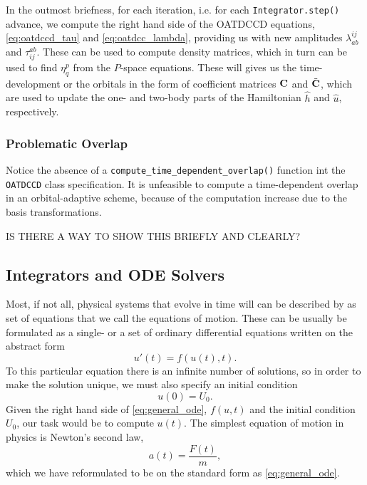     In the outmost briefness, for each iteration, i.e. for each 
    \lstinline{Integrator.step()} advance, we 
    compute the right hand side of the OATDCCD equations, \autoref{eq:oatdccd_tau} 
    and \autoref{eq:oatdcc_lambda}, providing us with new amplitudes 
    $\lambda^{ij}_{ab}$ and $\tau^{ab}_{ij}$. These can be used to compute density 
    matrices, which in turn can be used to find $\eta^p_q$ from the $P$-space 
    equations. These will gives us the time-development or the orbitals in 
    the form of coefficient matrices $\vb{C}$ and $\tilde{\vb{C}}$, which are used 
    to update the one- and two-body parts of the Hamiltonian $\hat{h}$ and $\hat{u}$,
    respectively.

    

    \subsubsection{Problematic Overlap}

    Notice the absence of a \lstinline{compute_time_dependent_overlap()} function
    int the \lstinline{OATDCCD} class specification. It is unfeasible to compute 
    a time-dependent overlap in an orbital-adaptive scheme, because of the 
    computation increase due to the basis transformations.

    IS THERE A WAY TO SHOW THIS BRIEFLY AND CLEARLY?

\subsection{Integrators and ODE Solvers}

    Most, if not all, physical systems that evolve in time will can be described by 
    as set of equations that we call the equations of motion. These can be usually 
    be formulated as a single- or a set of ordinary differential equations written 
    on the abstract form
    \begin{equation}
        \label{eq:general_ode}
        u'(t) = f(u(t), t).
    \end{equation}
    To this particular equation there is an infinite number of solutions, so in order to
    make the solution unique, we must also specify an initial condition
    \begin{equation}
        u(0) = U_0.
    \end{equation}
    Given the right hand side of \autoref{eq:general_ode}, $f(u,t)$ and the initial
    condition $U_0$, our task would be to compute $u(t)$. The simplest equation of motion
    in physics is Newton's second law,
    \begin{equation}
        a(t) = \frac{F(t)}{m},
    \end{equation}
    which we have reformulated to be on the standard form as \autoref{eq:general_ode}.
 
